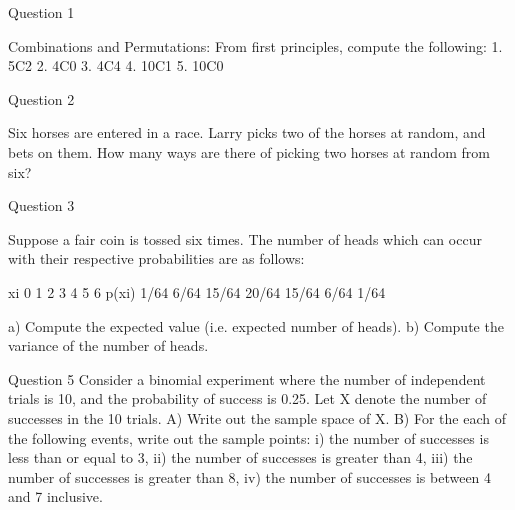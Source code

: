 \begin{frame}

Question 1 

Combinations and Permutations: From first principles, compute the following:
1.	5C2
2.	4C0
3.	4C4
4.	10C1
5.	10C0

\end{frame}
\begin{frame}

Question 2

Six horses are entered in a race. Larry picks two of the horses at random, and bets on them. 
How many ways are there of picking two horses at random from six?

\end{frame}
\begin{frame}

Question 3

Suppose a fair coin is tossed six times. The number of heads which can occur with their respective
probabilities are as follows:

xi	0	1	2	3	4	5	6
p(xi)	1/64	6/64	15/64	20/64	15/64	6/64	1/64

a)	Compute the expected value (i.e. expected number of heads).
b)	Compute the variance of the number of heads.

\end{frame}
\begin{frame}

Question 5
Consider a binomial experiment where the number of independent trials is 10, and the probability of success is 0.25. Let X denote the number of successes in the 10 trials.
A)	Write out the sample space of X.
B)	For the each of the following events, write out the sample points:
i)	the number of successes is less than or equal to 3,
ii)	the number of successes is greater than 4, 
iii)	the number of successes is greater than 8, 
iv)	the number of successes is between 4 and 7 inclusive.

\end{frame}
